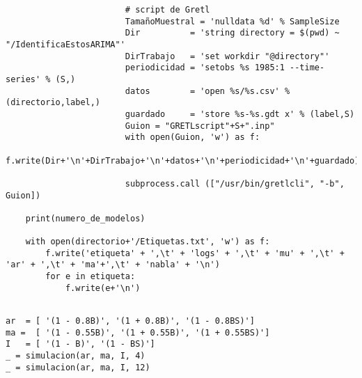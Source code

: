 \documentclass[11pt]{article}
\begin{document}
\begin{verbatim}
                        # script de Gretl
                        TamañoMuestral = 'nulldata %d' % SampleSize
                        Dir          = 'string directory = $(pwd) ~ "/IdentificaEstosARIMA"'
                        DirTrabajo   = 'set workdir "@directory"'
                        periodicidad = 'setobs %s 1985:1 --time-series' % (S,)
                        datos        = 'open %s/%s.csv' % (directorio,label,)
                        guardado     = 'store %s-%s.gdt x' % (label,S)
                        Guion = "GRETLscript"+S+".inp"
                        with open(Guion, 'w') as f:
                            f.write(Dir+'\n'+DirTrabajo+'\n'+datos+'\n'+periodicidad+'\n'+guardado)
                            
                        subprocess.call (["/usr/bin/gretlcli", "-b", Guion])
                        
    print(numero_de_modelos)

    with open(directorio+'/Etiquetas.txt', 'w') as f:
        f.write('etiqueta' + ',\t' + 'logs' + ',\t' + 'mu' + ',\t' + 'ar' + ',\t' + 'ma'+',\t' + 'nabla' + '\n')
        for e in etiqueta:
            f.write(e+'\n')
    
\end{verbatim}

\begin{verbatim}
ar  = [ '(1 - 0.8B)', '(1 + 0.8B)', '(1 - 0.8BS)']
ma =  [ '(1 - 0.55B)', '(1 + 0.55B)', '(1 + 0.55BS)']
I   = [ '(1 - B)', '(1 - BS)']
_ = simulacion(ar, ma, I, 4)
_ = simulacion(ar, ma, I, 12)
\end{verbatim}
\end{document}
